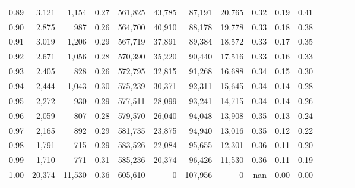 \begin{tabular}{rrrcrrrrrrrrrrr}
0.89 &   3,121 &   1,154 &                                       0.27 &  561,825 &   43,785 &   87,191 &   20,765 &  0.32 &  0.19 &                         0.41 \\
0.90 &   2,875 &     987 &                                       0.26 &  564,700 &   40,910 &   88,178 &   19,778 &  0.33 &  0.18 &                         0.38 \\
0.91 &   3,019 &   1,206 &                                       0.29 &  567,719 &   37,891 &   89,384 &   18,572 &  0.33 &  0.17 &                         0.35 \\
0.92 &   2,671 &   1,056 &                                       0.28 &  570,390 &   35,220 &   90,440 &   17,516 &  0.33 &  0.16 &                         0.33 \\
0.93 &   2,405 &     828 &                                       0.26 &  572,795 &   32,815 &   91,268 &   16,688 &  0.34 &  0.15 &                         0.30 \\
0.94 &   2,444 &   1,043 &                                       0.30 &  575,239 &   30,371 &   92,311 &   15,645 &  0.34 &  0.14 &                         0.28 \\
0.95 &   2,272 &     930 &                                       0.29 &  577,511 &   28,099 &   93,241 &   14,715 &  0.34 &  0.14 &                         0.26 \\
0.96 &   2,059 &     807 &                                       0.28 &  579,570 &   26,040 &   94,048 &   13,908 &  0.35 &  0.13 &                         0.24 \\
0.97 &   2,165 &     892 &                                       0.29 &  581,735 &   23,875 &   94,940 &   13,016 &  0.35 &  0.12 &                         0.22 \\
0.98 &   1,791 &     715 &                                       0.29 &  583,526 &   22,084 &   95,655 &   12,301 &  0.36 &  0.11 &                         0.20 \\
0.99 &   1,710 &     771 &                                       0.31 &  585,236 &   20,374 &   96,426 &   11,530 &  0.36 &  0.11 &                         0.19 \\
1.00 &  20,374 &  11,530 &                                       0.36 &  605,610 &        0 &  107,956 &        0 &   nan &  0.00 &                         0.00 \\
\bottomrule
\end{tabular}
